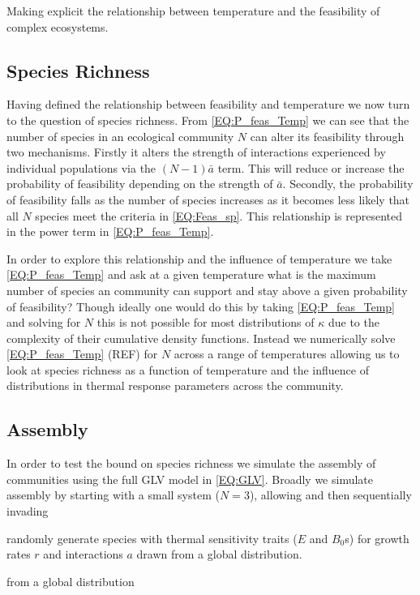 \documentclass{article}
\begin{document}
Making explicit the relationship between temperature and the feasibility of complex ecosystems. 

\subsection{Species Richness} \label{SEC:N_Sp}
Having defined the relationship between feasibility and temperature we now turn to the question of species richness. From \cref{EQ:P_feas_Temp} we can see that the number of species in an ecological community $N$ can alter its feasibility through two mechanisms. Firstly it alters the strength of interactions experienced by individual populations via the $(N-1) \bar{a}$ term. This will reduce or increase the probability of feasibility depending on the strength of $\bar{a}$. Secondly, the probability of feasibility falls as the number of species increases as it becomes less likely that all $N$ species meet the criteria in \cref{EQ:Feas_sp}. This relationship is represented in the power term in \cref{EQ:P_feas_Temp}. 

In order to explore this relationship and the influence of temperature we take \cref{EQ:P_feas_Temp} and ask at a given temperature what is the maximum number of species an community can support and stay above a given probability of feasibility? Though ideally one would do this by taking \cref{EQ:P_feas_Temp} and solving for $N$ this is not possible for most distributions of $\kappa$ due to the complexity of their cumulative density functions. Instead we numerically solve \cref{EQ:P_feas_Temp} (REF) for $N$ across a range of temperatures allowing us to look at species richness as a function of temperature and the influence of distributions in thermal response parameters across the community. 

\subsection{Assembly}

In order to test the bound on species richness we simulate the assembly of communities using the full GLV model in \cref{EQ:GLV}. Broadly we simulate assembly by starting with a small system ($N = 3$), allowing  and then sequentially invading 

randomly generate species with thermal sensitivity traits ($E$ and $B_0$s) for growth rates $r$ and interactions $a$ drawn from a global distribution. 

from a global distribution 
\end{document}
